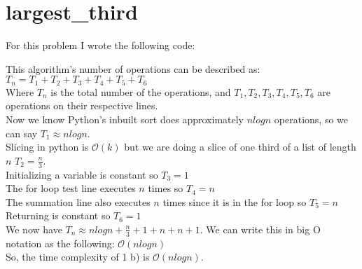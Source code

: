 \documentclass[12pt]{article}
\begin{document}
\section{largest\_third}
For this problem I wrote the following code:


This algorithm's number of operations can be described as:\\
$T_n = T_1 + T_2 + T_3 + T_4 + T_5 + T_6$\\
Where $T_n$ is the total number of the operations, and $T_1,T_2,T_3,T_4,T_5,T_6$ are operations on their respective lines.\\
Now we know Python's inbuilt sort does approximately $nlogn$ operations, so we can say $T_1 \approx nlogn$.\\
Slicing in python is $\mathcal{O}(k)$ but we are doing a slice of one third of a list of length $n$ $T_2 = \frac{n}{3}$.\\
Initializing a variable is constant so $T_3 = 1$\\
The for loop test line executes $n$ times so $T_4 = n$\\
The summation line also executes $n$ times since it is in the for loop so $T_5 = n$\\
Returning is constant so $T_6 = 1$\\
We now have $T_n \approx nlogn + \frac{n}{3} + 1 + n + n + 1$.
We can write this in big O notation as the following:
$\mathcal{O}(nlogn)$\\
So, the time complexity of 1 b) is $\mathcal{O}(nlogn)$.
\end{document}

